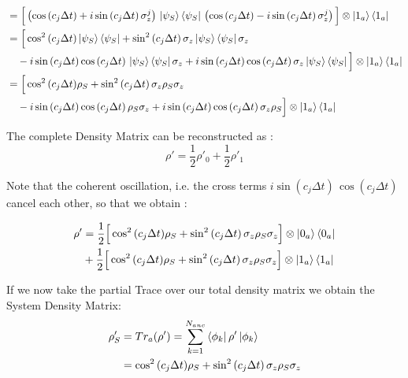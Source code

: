 \documentclass[a4paper,12pt]{article}
\begin{document}
\begin{align}
		& = \Big [ \left(\cos{\left( c_j \Delta t \right)} + i \sin{\left( c_j \Delta t \right)} \, \sigma_{z}^{j}\right) \, \ket{\psi_S}\bra{\psi_S} \, \left(\cos{\left( c_j \Delta t \right)} - i \sin{\left( c_j \Delta t \right)} \, \sigma_{z}^{j}\right) \Big]    \otimes \ket{1_a}\bra{1_a} \notag \\
		&= \Big [ \cos^{2}{\left(c_{j} \Delta t\right)} \ket{\psi_S}\bra{\psi_S} + \sin^{2}{\left(c_{j} \Delta t\right)} \, \sigma_{z} \ket{\psi_S}\bra{\psi_S} \sigma_{z} \notag \\
		& \quad - i \sin{\left(c_{j} \Delta t \right)} \cos{\left(c_{j} \Delta t\right)} \,  \ket{\psi_S}\bra{\psi_S} \sigma_{z} + i \sin{\left(c_{j} \Delta t \right)} \cos{\left(c_{j} \Delta t\right)} \, \sigma_{z} \ket{\psi_S}\bra{\psi_S}  \Big] \otimes \ket{1_a}\bra{1_a} \notag \\
		&= \Big [ \cos^{2}{\left(c_{j} \Delta t\right)} \rho_S + \sin^{2}{\left(c_{j} \Delta t\right)} \, \sigma_{z} \rho_S \sigma_{z} \notag \\
		& \quad - i \sin{\left(c_{j} \Delta t \right)} \cos{\left(c_{j} \Delta t\right)} \, \rho_S \sigma_{z} + i \sin{\left(c_{j} \Delta t \right)} \cos{\left(c_{j} \Delta t\right)} \, \sigma_{z} \rho_S \Big] \otimes \ket{1_a}\bra{1_a}
		\label{eq:rho_0_1_reconstruction}
	\end{align}

	The complete Density Matrix can be reconstructed as :
	\begin{equation}
		\rho' = \frac{1}{2} \rho'_{0} + \frac{1}{2} \rho'_{1}
		\label{eq:rho_complete_reconstruction}
	\end{equation}

	Note that the coherent oscillation, i.e. the cross terms $ i \sin{\left(c_{j} \Delta t\right)} \, \cos{\left(c_{j} \Delta t\right)} $ cancel each other, so that we obtain :

	\begin{align}
		\rho' &= \frac{1}{2} \Big[ \cos^{2}{\left(c_{j} \Delta t\right)} \rho_S + \sin^{2}{\left(c_{j} \Delta t\right)} \, \sigma_{z} \rho_S \sigma_{z} \Big] \otimes \ket{0_a}\bra{0_a} \notag \\
		& + \frac{1}{2} \Big[ \cos^{2}{\left(c_{j} \Delta t\right)} \rho_S + \sin^{2}{\left(c_{j} \Delta t\right)} \, \sigma_{z} \rho_S \sigma_{z} \Big] \otimes \ket{1_a}\bra{1_a}
		\label{eq:rho_complete_explicit}
	\end{align}

	If we now take the partial Trace over our total density matrix we obtain the System Density Matrix:
	\begin{align}
		\rho'_S & = Tr_a(\rho') = \sum_{k=1}^{N_{anc}}{\bra{\phi_k}\rho'\ket{\phi_k}} \notag \\
		&= \cos^{2}{\left(c_{j} \Delta t\right)} \rho_S + \sin^{2}{\left(c_{j} \Delta t\right)} \, \sigma_{z} \rho_S \sigma_{z}
		\label{eq:rho_s_partial_trace_diff}
	\end{align}
\end{document}
